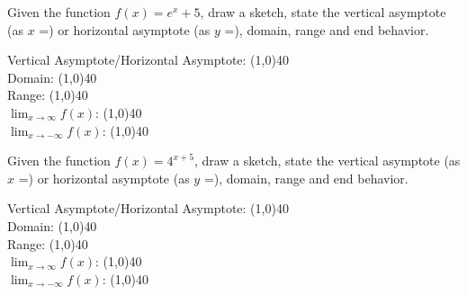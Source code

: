 \documentclass[addpoints]{exam}
\begin{document}
\begin{questions}
    \newpage
    
    \question[1] Given the function $f(x) = e^x + 5$, draw a sketch, state the vertical asymptote (as $x$ =) or horizontal asymptote (as $y$ =), domain, range and end behavior.
    
        \begin{left} 
        \end{left}
    
    Vertical Asymptote/Horizontal Asymptote: \line(1,0){40} \\
    \newline
    Domain: \line(1,0){40} \\
    \newline
    Range: \line(1,0){40} \\
    \newline
    $\lim_{x\to\infty} f(x)$: \line(1,0){40} \\
    \newline
    $\lim_{x\to-\infty} f(x)$: \line(1,0){40} \\
    
    \question[1] Given the function $f(x) = 4^{x+5}$, draw a sketch, state the vertical asymptote (as $x$ =) or horizontal asymptote (as $y$ =), domain, range and end behavior.
    
        \begin{left} 
        \end{left}
    
    Vertical Asymptote/Horizontal Asymptote: \line(1,0){40} \\
    \newline
    Domain: \line(1,0){40} \\
    \newline
    Range: \line(1,0){40} \\
    \newline
    $\lim_{x\to\infty} f(x)$: \line(1,0){40} \\
    \newline
    $\lim_{x\to-\infty} f(x)$: \line(1,0){40} \\
    

\end{questions}
\end{document}
